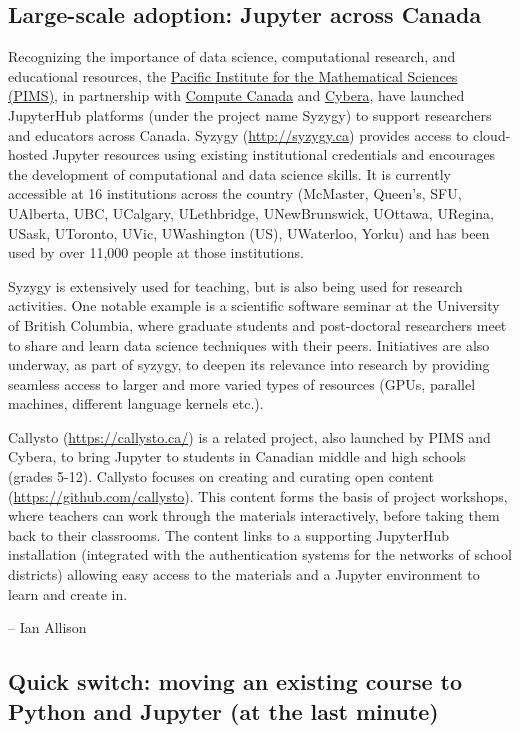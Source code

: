 \documentclass[]{book}
\begin{document}
\subsection{Large-scale adoption: Jupyter across
Canada}\label{large-scale-adoption-jupyter-across-canada}

Recognizing the importance of data science, computational research, and
educational resources, the \href{https://www.pims.math.ca/}{Pacific
Institute for the Mathematical Sciences (PIMS)}, in partnership with
\href{https://www.computecanada.ca/}{Compute Canada} and
\href{https://www.cybera.ca/}{Cybera}, have launched JupyterHub
platforms (under the project name Syzygy) to support researchers and
educators across Canada. Syzygy (\url{http://syzygy.ca}) provides access
to cloud-hosted Jupyter resources using existing institutional
credentials and encourages the development of computational and data
science skills. It is currently accessible at 16 institutions across the
country (McMaster, Queen's, SFU, UAlberta, UBC, UCalgary, ULethbridge,
UNewBrunswick, UOttawa, URegina, USask, UToronto, UVic, UWashington
(US), UWaterloo, Yorku) and has been used by over 11,000 people at those
institutions.

Syzygy is extensively used for teaching, but is also being used for
research activities. One notable example is a scientific software
seminar at the University of British Columbia, where graduate students
and post-doctoral researchers meet to share and learn data science
techniques with their peers. Initiatives are also underway, as part of
syzygy, to deepen its relevance into research by providing seamless
access to larger and more varied types of resources (GPUs, parallel
machines, different language kernels etc.).

Callysto (\url{https://callysto.ca/}) is a related project, also
launched by PIMS and Cybera, to bring Jupyter to students in Canadian
middle and high schools (grades 5-12). Callysto focuses on creating and
curating open content (\url{https://github.com/callysto}). This content
forms the basis of project workshops, where teachers can work through
the materials interactively, before taking them back to their
classrooms. The content links to a supporting JupyterHub installation
(integrated with the authentication systems for the networks of school
districts) allowing easy access to the materials and a Jupyter
environment to learn and create in.

-- Ian Allison

\subsection{Quick switch: moving an existing course to Python and
Jupyter (at the last
minute)}\label{quick-switch-moving-an-existing-course-to-python-and-jupyter-at-the-last-minute}
\end{document}
